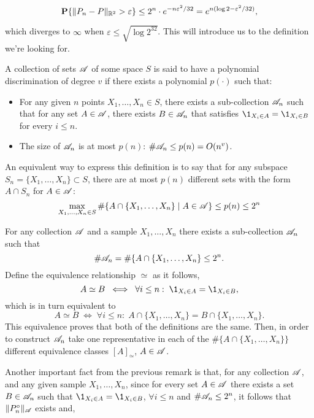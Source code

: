\begin{equation}
    \label{vc:4}
    \P\{\|P_n-P\|_{\mathcal{\R}^2} > \varepsilon\} \leq 2^n \cdot e^{-n \varepsilon^2 / 32} = e^{n(\log 2-\varepsilon^2/32)},
\end{equation}

which diverges to $\infty$ when $\varepsilon \leq \sqrt{\log 2^{32}}$. This will introduce us to the definition we're looking for.

\begin{definition}
    A collection of sets $\AA$ of some space $S$ is said to have a polynomial discrimination of degree $v$ if there exists a polynomial $p(\cdot)$ such that:
    \begin{itemize}
        \item For any given $n$ points $X_1,\ldots, X_n \in S$, there exists a sub-collection $\AA_n$ such that for any set $A \in \AA$, there exists $B \in \AA_n$ that satisfies $\1_{X_i \in A} = \1_{X_i \in B}$ for every $i \leq n$.
        \item The size of $\AA_n$ is at most $p(n)$: $\#\AA_n \leq p(n) = O(n^v)$.
    \end{itemize}
    An equivalent way to express this definition is to say that for any subspace $S_n = \{X_1,\ldots, X_n\} \subset S$, there are at most $p(n)$ different sets with the form $A\cap S_n$ for $A\in\AA$:
    \[ \max_{X_1,\ldots, X_n \in S} \#\{A \cap \{X_1,\ldots, X_n\} \;|\; A \in \AA\} \leq p(n) \leq 2^n\] 
\end{definition}
\begin{remark}
    For any collection $\AA$ and a sample $X_1,\ldots, X_n$ there exists a sub-collection $\AA_n$ such that
    \[ \#\AA_n = \# \{A \cap \{X_1,\ldots, X_n\} \leq 2^n. \] 
    Define the equivalence relationship $\simeq$ as it follows,
    \[ A \simeq B \; \iff \; \forall i\leq n : \; \1_{X_i \in A} = \1_{X_i \in B}, \] 
    which is in turn equivalent to
    \[ A \simeq B \; \iff \; \forall i\leq n : \; A \cap \{X_1,\ldots,X_n\} =  B \cap \{X_1,\ldots,X_n\}. \]
    This equivalence proves that both of the definitions are the same. Then, in order to construct $\AA_n$ take one representative in each of the $\# \{A \cap \{X_1,\ldots, X_n\}\}$ different equivalence classes ${[A]}_\simeq$, $A \in \AA$.
\end{remark}
Another important fact from the previous remark is that, for any collection $\AA$, and any given sample $X_1, \ldots, X_n$, since for every set $A \in \AA$ there exists a set $B \in \AA_n$ such that $\1_{X_i \in A} = \1_{X_i \in B}$, $\forall i\leq n$ and $\#\AA_n \leq 2^n$, it follows that $\|P_n^\circ\|_\AA$ exists and,
